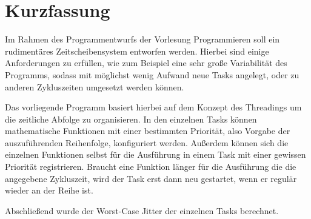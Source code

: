 \chapter*{Kurzfassung} %

Im Rahmen des Programmentwurfs der Vorlesung Programmieren soll ein rudimentäres Zeitscheibensystem entworfen werden.
Hierbei sind einige Anforderungen zu erfüllen, wie zum Beispiel eine sehr große Variabilität des Programms, sodass mit möglichst wenig Aufwand neue Tasks angelegt, oder zu anderen Zykluszeiten umgesetzt werden können. 

Das vorliegende Programm basiert hierbei auf dem Konzept des Threadings um die zeitliche Abfolge zu organisieren. 
In den einzelnen Tasks können mathematische Funktionen mit einer bestimmten Priorität, also Vorgabe der auszuführenden Reihenfolge, konfiguriert werden.
Außerdem können sich die einzelnen Funktionen selbst für die Ausführung in einem Task mit einer gewissen Priorität registrieren.
Braucht eine Funktion länger für die Ausführung die die angegebene Zykluszeit, wird der Task erst dann neu gestartet, wenn er regulär wieder an der Reihe ist.

Abschließend wurde der Worst-Case Jitter der einzelnen Tasks berechnet.

\cleardoublepage
